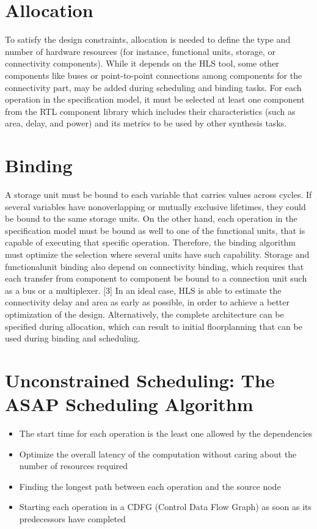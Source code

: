 \documentclass[conference]{IEEEtran}
\begin{document}
 \section{Allocation\\}
 To satisfy the design constraints, allocation is needed to define the type and number of hardware resources (for instance, functional units, storage, or connectivity components). While it depends on the HLS tool, some other components like buses or point-to-point connections among components for the connectivity part, may be added during scheduling and binding tasks. For each operation in the specification model, it must be selected at least one component from the RTL component library which includes their characteristics (such as area, delay, and power) and its metrics to be used by other synthesis tasks.
 
\section{Binding\\}
A storage unit must be bound to each variable that carries values across cycles. If several variables have nonoverlapping or mutually exclusive lifetimes, they could be bound to the same storage units. On the other hand, each operation in the specification model must be bound as well to one of the functional units, that is capable of executing that specific operation. Therefore, the binding algorithm must optimize the selection where several units have such capability. Storage and functionalunit binding also depend on connectivity binding, which requires that each transfer from component to component be bound to a connection unit such as a bus or a multiplexer. [3] In an ideal case, HLS is able to estimate the connectivity delay and area as early as possible, in order to achieve a better optimization of the design. Alternatively, the complete architecture can be specified during allocation, which can result to initial floorplanning that can be used during binding and scheduling.

 \section{Unconstrained Scheduling: The ASAP Scheduling Algorithm}
\begin{itemize}
\item The start time for each operation is the least one allowed by the dependencies
\item Optimize the overall latency of the computation without caring about the number of resources required
\item Finding the longest path between each operation and the source node
\item Starting each operation in a CDFG (Control Data Flow Graph) as soon as its predecessors have completed\\
\end{itemize}
\end{document}

